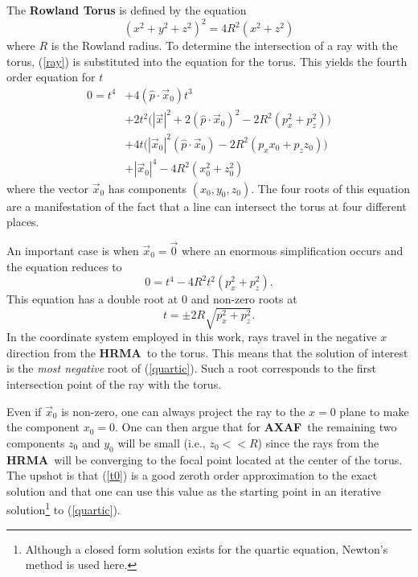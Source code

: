 \documentclass{article}
\newcommand{\HRMA}{{\bf HRMA}}
\newcommand{\AXAF}{{\bf AXAF}}
\newcommand{\eq}[1]{(\ref{#1})}
\newcommand{\p}{\hat{p}}
\newcommand{\x}{\vec{x}}
\begin{document}
 The {\bf Rowland Torus} is defined by the equation
\begin{equation} 
  (x^2 + y^2 + z^2)^2 = 4 R^2 (x^2 + z^2) \label{eq:torus}
\end{equation}
 where $R$ is the Rowland radius.  To determine the intersection of a ray
 with the torus, \eq{ray} is substituted into the equation for the torus.
 This yields the fourth order equation for $t$
\begin{equation}
\begin{split}
 0 = t^4 &+ 4 (\p\cdot\x_0)t^3  \\
         &+ 2t^2 \big(|\x|^2 + 2(\p\cdot\x_0)^2 - 2R^2(p_x^2 + p_z^2)\big) \\
         &+ 4t \big(|\x_0|^2 (\p\cdot\x_0) - 2R^2(p_x x_0 + p_z z_0)\big)  \\
         &+ |\x_0|^4 - 4R^2 (x_0^2 + z_0^2)  \label{quartic}
\end{split}
\end{equation}
 where the vector $\x_0$ has components $(x_0, y_0, z_0)$.
 The four roots of this equation are a manifestation of the fact that a line
 can intersect the torus at four different places.

 An important case is when $\x_0 = \vec{0}$ where an enormous simplification
 occurs and the equation reduces to
\begin{equation} 
   0 = t^4 - 4R^2t^2(p_x^2 + p_z^2).
\end{equation}
 This equation has a double root at $0$ and non-zero roots at
\begin{equation} 
   t = \pm 2R\sqrt{p_x^2 + p_z^2}.  \label{t0}
\end{equation}
 In the coordinate system employed in this work, rays travel in the negative
 $x$ direction from the \HRMA\ to the torus.  This means that the solution
 of interest is the {\em most negative} root of \eq{quartic}.  Such a root
 corresponds to the first intersection point of the ray with the torus.

 Even if $\x_0$ is non-zero, one can always project the ray to the $x = 0$
 plane to make the component $x_0 = 0$.  One can then argue that for \AXAF\
 the remaining two components $z_0$ and $y_0$ will be small (i.e., $z_0<<R$)
 since the rays from the \HRMA\ will be converging to the focal point
 located at the center of the torus.  The upshot is that \eq{t0} is a good
 zeroth order approximation to the exact solution and that one can use this
 value as the starting point in an iterative solution\footnote{Although a
 closed form solution exists for the quartic equation, Newton's method is
 used here.} to \eq{quartic}.
\end{document}
